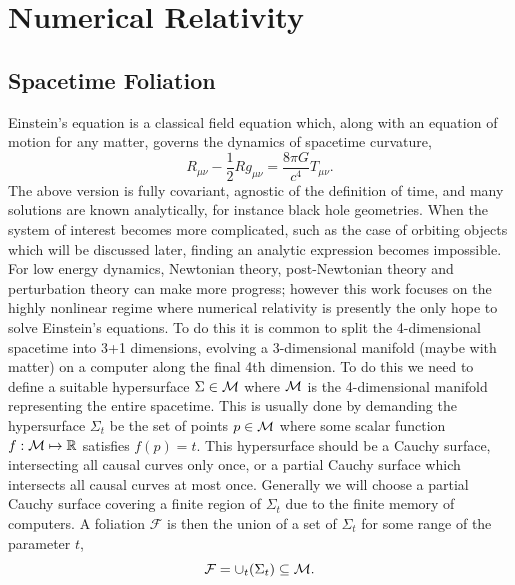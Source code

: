 






\section{Numerical Relativity}\label{nr:sec:nr}
\subsection{Spacetime Foliation} \label{nr:sec:foliation}
Einstein's equation is a classical field equation which, along with an equation of motion for any matter, governs the dynamics of spacetime curvature,
\begin{equation}\label{nr:eq:einstein}R_{\mu\nu} - \frac{1}{2} Rg_{\mu\nu} = \frac{8\pi G}{c^4}T_{\mu\nu}.\end{equation}
The above version is fully covariant, agnostic of the definition of time, and many solutions are known analytically, for instance black hole geometries. When the system of interest becomes more complicated, such as the case of orbiting objects which will be discussed later, finding an analytic expression becomes impossible. For low energy dynamics, Newtonian theory, post-Newtonian theory and perturbation theory can make more progress; however this work focuses on the highly nonlinear regime where numerical relativity is presently the only hope to solve Einstein's equations. To do this it is common to split the 4-dimensional spacetime into 3+1 dimensions, evolving a 3-dimensional manifold (maybe with matter) on a computer along the final 4th dimension. To do this we need to define a suitable hypersurface $\Sigma \in \mathcal{M}$ where $\mathcal{M}$ is the 4-dimensional manifold representing the entire spacetime. This is usually done by demanding the hypersurface $\Sigma_t$ be the set of points $p \in \mathcal{M}$ where some scalar function $f:\mathcal{M}\mapsto \mathbb{R}$ satisfies $f(p)=t$. This hypersurface should be a Cauchy surface, intersecting all causal curves only once, or a partial Cauchy surface which intersects all causal curves at most once.
Generally we will choose a partial Cauchy surface covering a finite region of $\Sigma_t$ due to the finite memory of computers.
A foliation $\mathcal{F}$ is then the union of a set of $\Sigma_t$ for some range of the parameter $t$,
\begin{equation}\mathcal{F} = \cup_t(\Sigma_t) \subseteq \mathcal{M}.\end{equation}
